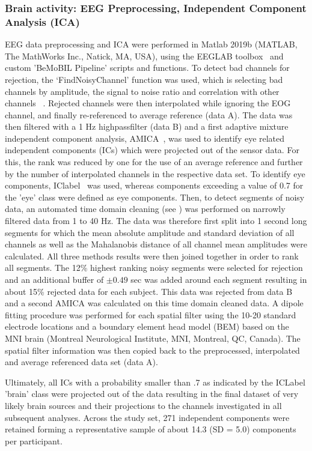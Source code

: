 \subsubsection{Brain activity: EEG Preprocessing, Independent Component Analysis (ICA)}
EEG data preprocessing and ICA were performed in Matlab 2019b (MATLAB, The MathWorks Inc., Natick, MA, USA), using the EEGLAB toolbox~\cite{Delorme2004-sn} and custom 'BeMoBIL Pipeline' scripts and functions. To detect bad channels for rejection, the `FindNoisyChannel' function was used, which is selecting bad channels by amplitude, the signal to noise ratio and correlation with other channels ~\cite{Bigdely-Shamlo2015-ds}. Rejected channels were then interpolated while ignoring the EOG channel, and finally re-referenced to average reference (data A). The data was then filtered with a 1 Hz highpassfilter (data B) and a first adaptive mixture independent component analysis, AMICA~\cite{Palmer2011-zs}, was used to identify eye related independent components (ICs) which were projected out of the sensor data. For this, the rank was reduced by one for the use of an average reference and further by the number of interpolated channels in the respective data set. To identify eye components, IClabel~\cite{Pion-Tonachini2019-fy} was used, whereas components exceeding a value of 0.7 for the 'eye' class were defined as eye components. Then, to detect segments of noisy data, an automated time domain cleaning (see \cite{Gramann2018-fj}) was performed on narrowly filtered data from 1 to 40 Hz. The data was therefore first split into 1 second long segments for which the mean absolute amplitude and standard deviation of all channels as well as the Mahalanobis distance of all channel mean amplitudes were calculated. All three methods results were then joined together in order to rank all segments. The 12\% highest ranking noisy segments were selected for rejection and an additional buffer of $\pm 0.49$ sec was added around each segment resulting in about 15\% rejected data for each subject. This data was rejected from data B and a second AMICA was calculated on this time domain cleaned data. A dipole fitting procedure was performed for each spatial filter using the 10-20 standard electrode locations and a boundary element head model (BEM) based on the MNI brain (Montreal Neurological Institute, MNI, Montreal, QC, Canada). The spatial filter information was then copied back to the preprocessed, interpolated and average referenced data set (data A).

Ultimately, all ICs with a probability smaller than .7 as indicated by the ICLabel 'brain' class were projected out of the data resulting in the final dataset of very likely brain sources and their projections to the channels investigated in all subsequent analyses. Across the study set, 271 independent components were retained forming a representative sample of about 14.3 (SD = 5.0) components per participant. 


